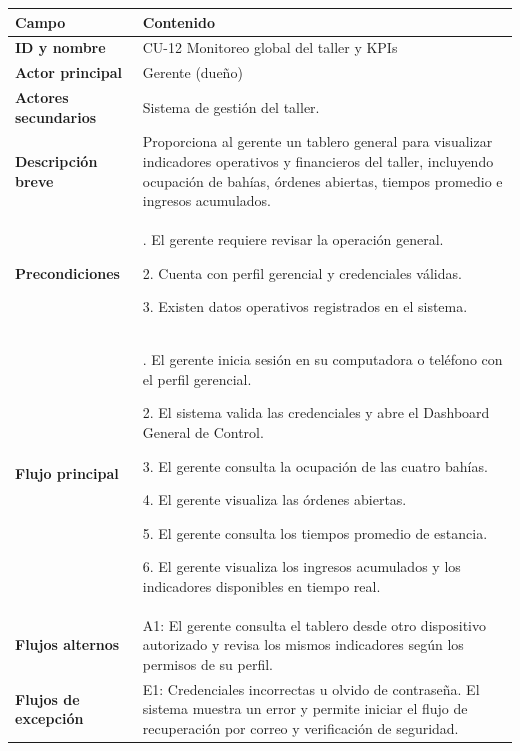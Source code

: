 {\def\LTcaptype{none} %
\begin{longtable}[]{@{}
  >{\raggedright\arraybackslash}p{}
  >{\raggedright\arraybackslash}p{}@{}}
\toprule\noalign{}
\begin{minipage}[b]{\linewidth}\raggedright
\textbf{Campo}
\end{minipage} & \begin{minipage}[b]{\linewidth}\raggedright
\textbf{Contenido}
\end{minipage} \\
\midrule\noalign{}
\endhead
\bottomrule\noalign{}
\endlastfoot
\textbf{ID y nombre} & CU-12 Monitoreo global del taller y KPIs \\
\textbf{Actor principal} & Gerente (dueño) \\
\textbf{Actores secundarios} & Sistema de gestión del taller. \\
\textbf{Descripción breve} & Proporciona al gerente un tablero general
para visualizar indicadores operativos y financieros del taller,
incluyendo ocupación de bahías, órdenes abiertas, tiempos promedio e
ingresos acumulados. \\
\textbf{Precondiciones} & 1. El gerente requiere revisar la operación
general.

2. Cuenta con perfil gerencial y credenciales válidas.

3. Existen datos operativos registrados en el sistema. \\
\textbf{Flujo principal} & 1. El gerente inicia sesión en su computadora
o teléfono con el perfil gerencial.

2. El sistema valida las credenciales y abre el Dashboard General de
Control.

3. El gerente consulta la ocupación de las cuatro bahías.

4. El gerente visualiza las órdenes abiertas.

5. El gerente consulta los tiempos promedio de estancia.

6. El gerente visualiza los ingresos acumulados y los indicadores
disponibles en tiempo real. \\
\textbf{Flujos alternos} & A1: El gerente consulta el tablero desde otro
dispositivo autorizado y revisa los mismos indicadores según los
permisos de su perfil. \\
\textbf{Flujos de excepción} & E1: Credenciales incorrectas u olvido de
contraseña. El sistema muestra un error y permite iniciar el flujo de
recuperación por correo y verificación de seguridad.


\end{longtable}}
